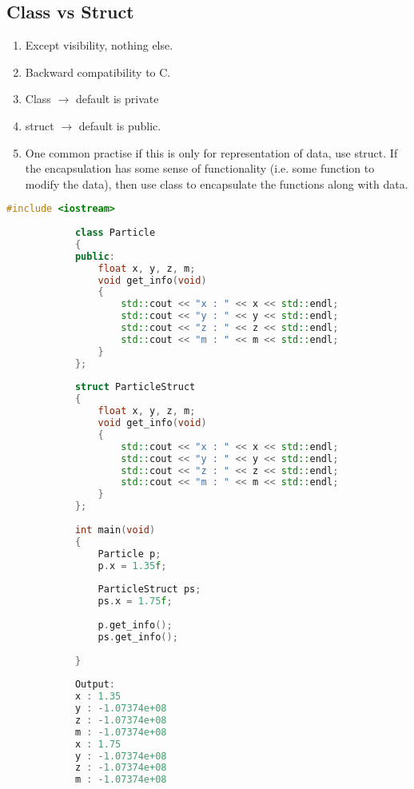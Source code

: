 \documentclass{article}
\begin{document}
    \subsection{Class vs Struct}
        \begin{enumerate}
            \item Except visibility, nothing else.
            \item Backward compatibility to C.
            \item Class $\rightarrow$ default is private
            \item struct $\rightarrow$ default is public.
            \item One common practise if this is only for representation of data, use struct. If the encapsulation has some sense of functionality (i.e. some function to modify the data), then use class to encapsulate the functions along with data.
        \end{enumerate}
        
        \begin{lstlisting}[language=C++, caption=Class vs Struct example]
            #include <iostream>
            
            class Particle
            {
            public:
            	float x, y, z, m;
            	void get_info(void)
            	{
            		std::cout << "x : " << x << std::endl;
            		std::cout << "y : " << y << std::endl;
            		std::cout << "z : " << z << std::endl;
            		std::cout << "m : " << m << std::endl;
            	}
            };
            
            struct ParticleStruct
            {
            	float x, y, z, m;
            	void get_info(void)
            	{
            		std::cout << "x : " << x << std::endl;
            		std::cout << "y : " << y << std::endl;
            		std::cout << "z : " << z << std::endl;
            		std::cout << "m : " << m << std::endl;
            	}
            };
            
            int main(void)
            {
            	Particle p;
            	p.x = 1.35f;
            	
            	ParticleStruct ps;
            	ps.x = 1.75f;
            	
            	p.get_info();
            	ps.get_info();
            
            }
            
            Output:
            x : 1.35
            y : -1.07374e+08
            z : -1.07374e+08
            m : -1.07374e+08
            x : 1.75
            y : -1.07374e+08
            z : -1.07374e+08
            m : -1.07374e+08
    
        \end{lstlisting}
        
\end{document}
